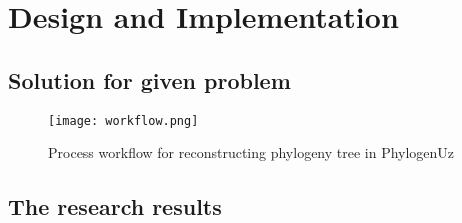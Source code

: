 \chapter{Design and Implementation}

\section{Solution for given problem}

\begin{figure}[!htbp] 
  \center
  \texttt{[image: workflow.png]}
  \caption[w]{Process workflow for reconstructing 
  phylogeny tree in PhylogenUz} 
  \label{img:workflow1}  
\end{figure}

\section{The research results}

\newpage